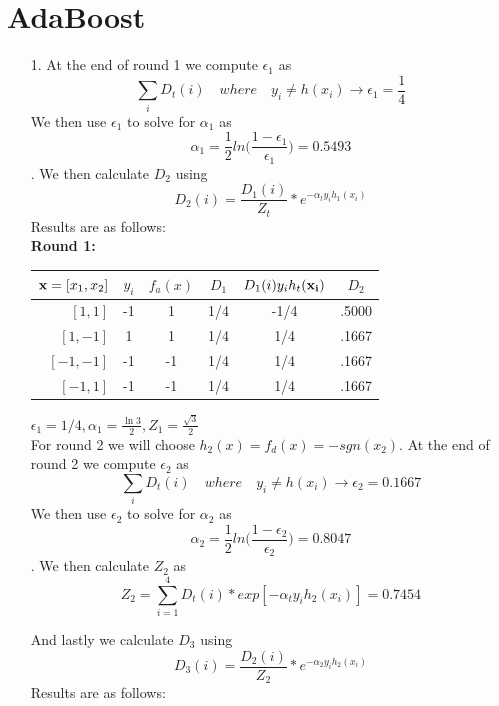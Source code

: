 \documentclass[11pt,a4paper]{article}
\begin{document}
	\section{AdaBoost}
		\begin{itemize}
			\item [1.]
			At the end of round 1 we compute $\epsilon_1$ as $$\displaystyle\sum_{i} D_t (i) \quad where \quad y_i \neq h(x_i) \rightarrow \epsilon_1 = \frac{1}{4} $$ We then use $\epsilon_1$ to solve for $\alpha_1$ as $$\alpha_1 = \frac{1}{2} ln \Big( \frac{1-\epsilon_1}{\epsilon_1} \Big) = 0.5493$$. We then calculate $D_2$ using $$D_2(i) = \frac{D_1(i)}{Z_t}*e^{-\alpha_t y_i h_1(x_i)}$$ Results are as follows:\\
			
				\textbf{Round 1:}
				\begin{center}
					\begin{tabular}{rccccc}
						\toprule
						${\bf x} = [x_1,x_2]$ & $y_i$ & $f_a(x)$ & $D_1$ & $D_{1}(i)y_{i}h_t({\bf x_i})$ & $D_2$ \\
						\midrule
						$[1,  1]$             & -1    & 1        & 1/4   & -1/4                          &  .5000     \\
						$[1, -1]$             & 1     & 1        & 1/4   & 1/4                           &  .1667     \\
						$[-1,-1]$             & -1    & -1       & 1/4   & 1/4                           &  .1667     \\
						$[-1, 1]$             & -1    & -1       & 1/4   & 1/4                           &  .1667     \\
						\bottomrule
					\end{tabular}
				\end{center}
			$\epsilon_1 = 1/4, \alpha_1 = \frac{\ln3}{2}, Z_1 = \frac{\sqrt{3}}{2}$ \\
			
			For round 2 we will choose $h_2(x) = f_d(x) = -sgn(x_2)$. At the end of round 2 we compute $\epsilon_2$ as $$\displaystyle\sum_{i} D_t (i) \quad where \quad y_i \neq h(x_i) \rightarrow \epsilon_2 = 0.1667 $$ We then use $\epsilon_2$ to solve for $\alpha_2$ as $$\alpha_2 = \frac{1}{2} ln \Big( \frac{1-\epsilon_2}{\epsilon_2} \Big) = 0.8047$$. We then calculate $Z_2$ as $$Z_2 = \displaystyle\sum_{i=1}^4 D_t(i)*exp[-\alpha_t y_i h_2(x_i)] = 0.7454$$
			
			And lastly we calculate $D_3$ using $$D_3(i) = \frac{D_2(i)}{Z_2}*e^{-\alpha_2 y_i h_2(x_i)}$$ Results are as follows:\\
			

\end{itemize}
\end{document}
